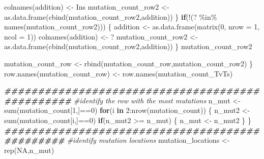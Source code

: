 \documentclass[
]{article}
\newenvironment{Shaded}{\begin{snugshade}}{\end{snugshade}}
\newcommand{\AttributeTok}[1]{\textcolor[rgb]{0.77,0.63,0.00}{#1}}
\newcommand{\CommentTok}[1]{\textcolor[rgb]{0.56,0.35,0.01}{\textit{#1}}}
\newcommand{\ConstantTok}[1]{\textcolor[rgb]{0.00,0.00,0.00}{#1}}
\newcommand{\ControlFlowTok}[1]{\textcolor[rgb]{0.13,0.29,0.53}{\textbf{#1}}}
\newcommand{\DecValTok}[1]{\textcolor[rgb]{0.00,0.00,0.81}{#1}}
\newcommand{\DocumentationTok}[1]{\textcolor[rgb]{0.56,0.35,0.01}{\textbf{\textit{#1}}}}
\newcommand{\FunctionTok}[1]{\textcolor[rgb]{0.00,0.00,0.00}{#1}}
\newcommand{\NormalTok}[1]{#1}
\newcommand{\OtherTok}[1]{\textcolor[rgb]{0.56,0.35,0.01}{#1}}
\newcommand{\SpecialCharTok}[1]{\textcolor[rgb]{0.00,0.00,0.00}{#1}}
\newcommand{\StringTok}[1]{\textcolor[rgb]{0.31,0.60,0.02}{#1}}
\begin{document}
\begin{Shaded}
\begin{Highlighting}[]
    \FunctionTok{colnames}\NormalTok{(addition) }\OtherTok{\textless{}{-}} \StringTok{\textquotesingle{}Ins\textquotesingle{}}
\NormalTok{    mutation\_count\_row2 }\OtherTok{\textless{}{-}} \FunctionTok{as.data.frame}\NormalTok{(}\FunctionTok{cbind}\NormalTok{(mutation\_count\_row2,addition))}
\NormalTok{  \}}
  \ControlFlowTok{if}\NormalTok{(}\SpecialCharTok{!}\NormalTok{(}\StringTok{\textquotesingle{}?\textquotesingle{}} \SpecialCharTok{\%in\%} \FunctionTok{names}\NormalTok{(mutation\_count\_row2)))}
\NormalTok{  \{}
\NormalTok{    addition }\OtherTok{\textless{}{-}} \FunctionTok{as.data.frame}\NormalTok{(}\FunctionTok{matrix}\NormalTok{(}\DecValTok{0}\NormalTok{, }\AttributeTok{nrow =} \DecValTok{1}\NormalTok{, }\AttributeTok{ncol =} \DecValTok{1}\NormalTok{))}
    \FunctionTok{colnames}\NormalTok{(addition) }\OtherTok{\textless{}{-}} \StringTok{\textquotesingle{}?\textquotesingle{}}
\NormalTok{    mutation\_count\_row2 }\OtherTok{\textless{}{-}} \FunctionTok{as.data.frame}\NormalTok{(}\FunctionTok{cbind}\NormalTok{(mutation\_count\_row2,addition))}
\NormalTok{  \}}
\NormalTok{  mutation\_count\_row2}
  
\NormalTok{  mutation\_count\_row }\OtherTok{\textless{}{-}} \FunctionTok{rbind}\NormalTok{(mutation\_count\_row,mutation\_count\_row2)}
\NormalTok{\}}
\FunctionTok{row.names}\NormalTok{(mutation\_count\_row) }\OtherTok{\textless{}{-}} \FunctionTok{row.names}\NormalTok{(mutation\_count\_TvTs)}

\DocumentationTok{\#\#\#\#\#\#\#\#\#\#\#\#\#\#\#\#\#\#\#\#\#\#\#\#\#\#\#\#\#\#\#\#\#\#\#\#\#\#\#\#\#\#\#\#\#\#\#\#}
\CommentTok{\#identify the row with the most mutations}
\NormalTok{n\_mut }\OtherTok{\textless{}{-}} \FunctionTok{sum}\NormalTok{(mutation\_count[}\DecValTok{1}\NormalTok{,]}\SpecialCharTok{==}\DecValTok{0}\NormalTok{)}
\ControlFlowTok{for}\NormalTok{(i }\ControlFlowTok{in} \DecValTok{2}\SpecialCharTok{:}\FunctionTok{nrow}\NormalTok{(mutation\_count))}
\NormalTok{\{}
\NormalTok{  n\_mut2 }\OtherTok{\textless{}{-}} \FunctionTok{sum}\NormalTok{(mutation\_count[i,]}\SpecialCharTok{==}\DecValTok{0}\NormalTok{)}
  \ControlFlowTok{if}\NormalTok{(n\_mut2 }\SpecialCharTok{\textgreater{}=}\NormalTok{ n\_mut)}
\NormalTok{  \{}
\NormalTok{    n\_mut }\OtherTok{\textless{}{-}}\NormalTok{ n\_mut2}
\NormalTok{  \}}
\NormalTok{\}}
\DocumentationTok{\#\#\#\#\#\#\#\#\#\#\#\#\#\#\#\#\#\#\#\#\#\#\#\#\#\#\#\#\#\#\#\#\#\#\#\#\#\#\#\#\#\#\#\#\#\#\#}
\CommentTok{\#identify mutation locations}
\NormalTok{mutation\_locations }\OtherTok{\textless{}{-}} \FunctionTok{rep}\NormalTok{(}\ConstantTok{NA}\NormalTok{,n\_mut)}


\end{Highlighting}
\end{Shaded}
\end{document}
